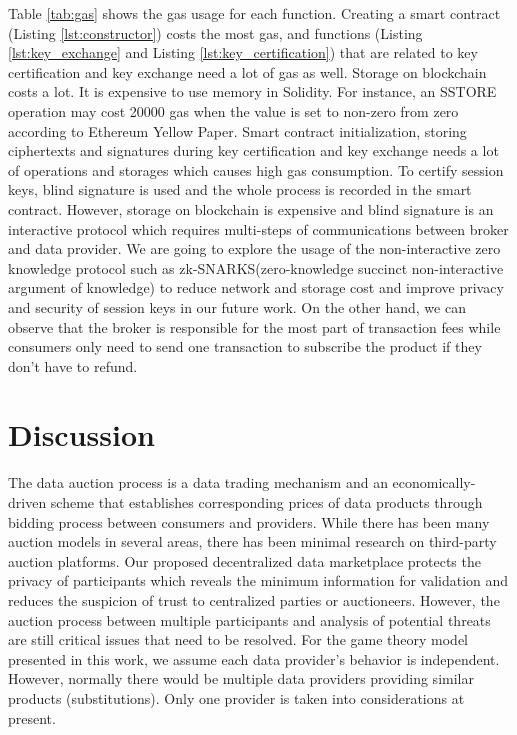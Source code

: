 \documentclass[journal,article,applsci,submit,moreauthors,pdftex]{Definitions/mdpi}
\begin{document}
Table \ref{tab:gas} shows the gas usage for each function. Creating a smart contract (Listing \ref{lst:constructor}) costs the most gas, and functions (Listing \ref{lst:key_exchange} and Listing \ref{lst:key_certification}) that are related to key certification and key exchange need a lot of gas as well. Storage on blockchain costs a lot. It is expensive to use memory in Solidity. For instance, an SSTORE operation may cost 20000 gas when the value is set to non-zero from zero according to Ethereum Yellow Paper\cite{Ethereum}. Smart contract initialization, storing ciphertexts and signatures during key certification and key exchange needs a lot of operations and storages which causes high gas consumption. To certify session keys, blind signature is used and the whole process is recorded in the smart contract. However, storage on blockchain is expensive and blind signature is an interactive protocol which requires multi-steps of communications between broker and data provider. We are going to explore the usage of the non-interactive zero knowledge protocol such as zk-SNARKS(zero-knowledge succinct non-interactive argument of knowledge)\cite{Snark} to reduce network and storage cost and improve privacy and security of session keys in our future work. On the other hand, we can observe that the broker is responsible for the most part of transaction fees while consumers only need to send one transaction to subscribe the product if they don't have to refund.



\section{Discussion}

The data auction process is a data trading mechanism and an economically-driven scheme that establishes corresponding prices of data products through bidding process between consumers and providers. While there has been many auction models\cite{BigPicDataMarket} in several areas, there has been minimal research on third-party auction platforms. Our proposed decentralized data marketplace protects the privacy of participants which reveals the minimum information for validation and reduces the suspicion of trust to centralized parties or auctioneers. However, the auction process between multiple participants and analysis of potential threats are still critical issues that need to be resolved. For the game theory model presented in this work, we assume each data provider's behavior is independent. However, normally there would be multiple data providers providing similar products (substitutions). Only one provider is taken into considerations at present.
\end{document}
